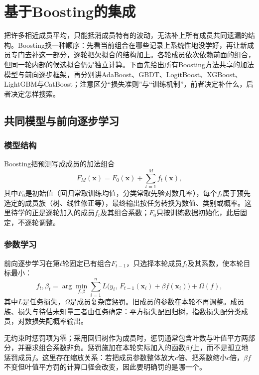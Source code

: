 \section{基于Boosting的集成}
\label{sec:ensemble-boosting}

把许多相近成员平均，只能抵消成员特有的波动，无法补上所有成员共同遗漏的结构。Boosting换一种顺序：先看当前组合在哪些记录上系统性地没学好，再让新成员专门去补这一部分，逐轮把欠拟合的结构加上。各轮成员依次依赖前面的组合，但同一轮内部的候选拟合仍是独立计算。下面先给出所有Boosting方法共享的加法模型与前向逐步框架，再分别讲AdaBoost、GBDT、LogitBoost、XGBoost、LightGBM与CatBoost；注意区分“损失准则”与“训练机制”，前者决定补什么，后者决定怎样搜索。

\subsection{共同模型与前向逐步学习}
\label{sec:ensemble-stagewise-additive}

\subsubsection{模型结构}
Boosting把预测写成成员的加法组合
\begin{equation}
  F_M(\bm x)=F_0(\bm x)+\sum_{t=1}^M f_t(\bm x),
  \label{eq:ensemble-additive}
\end{equation}
其中$F_0$是初始值（回归常取训练均值，分类常取先验对数几率），每个$f_t$属于预先选定的成员族（树、线性修正等），最终输出按任务转换为数值、类别或概率。这里待学的正是逐轮加入的成员$f_t$及其组合系数；$F_0$只按训练数据初始化，此后固定，不逐轮调整。

\subsubsection{参数学习}

前向逐步学习在第$t$轮固定已有组合$F_{t-1}$，只选择本轮成员$f_t$及其系数，使本轮目标最小：
\begin{equation}
  f_t,\beta_t=\arg\min_{f,\beta}\sum_{i=1}^n L\big(y_i,\,F_{t-1}(\bm x_i)+\beta f(\bm x_i)\big)+\Omega(f),
  \label{eq:ensemble-stagewise}
\end{equation}
其中$L$是任务损失，$\Omega$是成员复杂度惩罚。旧成员的参数在本轮不再调整。成员族、损失与待估未知量三者由任务确定：平方损失配回归树，指数损失配分类成员，对数损失配概率输出。

无约束时惩罚项为零；采用回归树作为成员时，惩罚通常包含叶数与叶值平方两部分，并要求组合系数非负。惩罚施加在本轮实际加入的函数$\beta f$上，而不是孤立地惩罚成员$f$。这里存在缩放关系：若把成员参数整体放大$c$倍、把系数缩小$c$倍，$\beta f$不变但叶值平方罚的计算口径会改变，因此要明确罚的是哪一个。

